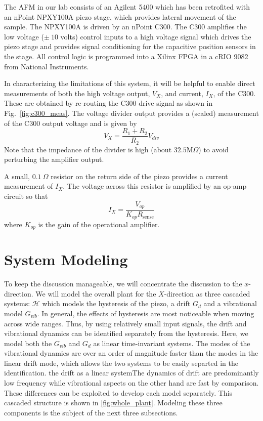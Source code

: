 \documentclass[journal,twocolumn,twoside]{IEEEtran}
\begin{document}

The AFM in our lab consists of an Agilent 5400 which has been retrofited with an nPoint NPXY100A piezo stage, which provides lateral movement of the sample. The NPXY100A is driven by an nPoint C300. The C300 amplifies the low voltage ($\pm~10$ volts) control inputs to a high voltage signal which drives the piezo stage and provides signal conditioning for the capacitive position sensors in the stage. All control logic is programmed into a Xilinx FPGA in a cRIO 9082 from National Instruments.

In characterizing the limitations of this system, it will be helpful to enable direct measurements of both the high voltage output, $V_X$, and current, $I_X$, of the C300. These are obtained by re-routing the C300 drive signal as shown in Fig.~\ref{fig:c300_meas}. The voltage divider output provides a (scaled) measurement of the C300 output voltage and is given by
\begin{equation}
V_X = \frac{R_1 + R_2}{R_2}V_{div}
\end{equation}
Note that the impedance of the divider is high (about $32.5\text{M}\Omega$) to avoid perturbing the amplifier output.

A small, $0.1~\Omega$ resistor on the return side of the piezo provides a current measurement of $I_X$. The voltage across this resistor is amplified by an op-amp circuit so that
\begin{equation}
I_{X} = \frac{V_{op}}{K_{op}R_{\text{sense}}}
\end{equation}
where $K_{op}$ is the gain of the operational amplifier.

\section{System Modeling}
To keep the discussion manageable, we will concentrate the discussion to the $x$-direction. We will model the overall plant for the $X$-direction as three cascaded systems: $\mathcal{H}$ which models the hysteresis of the piezo, a drift  $G_d$ and a vibrational model $G_{vib}$. In general, the effects of hysteresis are most noticeable when moving across wide ranges. Thus, by using relatively small input signals, the drift and vibrational dynamics can be identified separately from the hysteresis. Here, we model both the $G_{vib}$ and $G_d$ as linear time-invariant systems. The modes of the vibrational dynamics are over an order of magnitude faster than the modes in the linear drift mode, which allows the two systems to be easily separted in the identification.  the drift as a linear systemThe dynamics of drift are predominantly low frequency while vibrational aspects on the other hand are fast by comparison. These differences can be exploited to develop each model separately. This cascaded structure is shown in \ref{fig:whole_plant}. Modeling these three components is the subject of the next three subsections.
\end{document}
